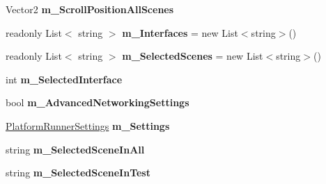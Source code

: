 \begin{DoxyCompactItemize}
Vector2 {\bfseries m\+\_\+\+Scroll\+Position\+All\+Scenes}
\item 
\mbox{\label{class_unity_test_1_1_integration_tests_1_1_platform_runner_settings_window_a1c80e96a5f7a2ed8433286210e08936d}} 
readonly List$<$ string $>$ {\bfseries m\+\_\+\+Interfaces} = new List$<$string$>$()
\item 
\mbox{\label{class_unity_test_1_1_integration_tests_1_1_platform_runner_settings_window_af34a02c51901d46f9c8c7a902c0c1e09}} 
readonly List$<$ string $>$ {\bfseries m\+\_\+\+Selected\+Scenes} = new List$<$string$>$()
\item 
\mbox{\label{class_unity_test_1_1_integration_tests_1_1_platform_runner_settings_window_ada2eac54fd78b77934407524137dd94c}} 
int {\bfseries m\+\_\+\+Selected\+Interface}
\item 
\mbox{\label{class_unity_test_1_1_integration_tests_1_1_platform_runner_settings_window_a8a3a3f826e0ec9aae3cbeae498fd5594}} 
bool {\bfseries m\+\_\+\+Advanced\+Networking\+Settings}
\item 
\mbox{\label{class_unity_test_1_1_integration_tests_1_1_platform_runner_settings_window_a6bc507ac2487f4b8ae15d6898e7463f5}} 
\hyperlink{class_unity_test_1_1_platform_runner_settings}{Platform\+Runner\+Settings} {\bfseries m\+\_\+\+Settings}
\item 
\mbox{\label{class_unity_test_1_1_integration_tests_1_1_platform_runner_settings_window_a6083caba9611e6ace6f543d37d6ee896}} 
string {\bfseries m\+\_\+\+Selected\+Scene\+In\+All}
\item 
\mbox{\label{class_unity_test_1_1_integration_tests_1_1_platform_runner_settings_window_af21d1047ab1d067fbec0552c62a4eb0c}} 
string {\bfseries m\+\_\+\+Selected\+Scene\+In\+Test}

\end{DoxyCompactItemize}
